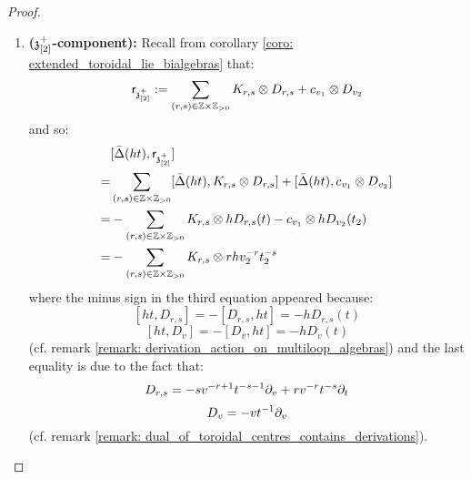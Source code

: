\begin{proof}
\begin{enumerate}
\begin{enumerate}
                        \item \textbf{($\mathfrak{z}_{[2]}^+$-component):} Recall from corollary \ref{coro: extended_toroidal_lie_bialgebras} that:
                            $$\sfr_{\z_{[2]}^+} := \sum_{(r, s) \in \Z \x \Z_{> 0}} K_{r, s} \tensor D_{r, s} + c_{v_1} \tensor D_{v_2}$$
                        and so:
                            $$
                                \begin{aligned}
                                    & [\bar{\Delta}(ht), \sfr_{\z_{[2]}^+}]
                                    \\
                                    = & \sum_{(r, s) \in \Z \x \Z_{> 0}} [\bar{\Delta}(ht), K_{r, s} \tensor D_{r, s}] + [\bar{\Delta}(ht), c_{v_1} \tensor D_{v_2}]
                                    \\
                                    = & -\sum_{(r, s) \in \Z \x \Z_{> 0}} K_{r, s} \tensor h D_{r, s}(t) - c_{v_1} \tensor h D_{v_2}(t_2)
                                    \\
                                    = & -\sum_{(r, s) \in \Z \x \Z_{> 0}} K_{r, s} \tensor r h v_2^{-r} t_2^{-s}
                                \end{aligned}
                            $$
                        where the minus sign in the third equation appeared because:
                            $$[ht, D_{r, s}] = -[D_{r, s}, ht] = -h D_{r, s}(t)$$
                            $$[ht, D_v] = -[D_v, ht] = -h D_v(t)$$
                        (cf. remark \ref{remark: derivation_action_on_multiloop_algebras}) and the last equality is due to the fact that:
                            $$D_{r, s} = -s v^{-r + 1} t^{-s - 1} \partial_v + r v^{-r} t^{-s} \partial_t$$
                            $$D_v = -v t^{-1} \partial_v$$
                        (cf. remark \ref{remark: dual_of_toroidal_centres_contains_derivations}). 
                        

\end{enumerate}
\end{enumerate}
\end{proof}
